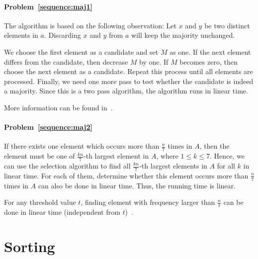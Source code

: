 \begin{Answer}
\paragraph{Problem~\ref{sequence:maj1}}
The algorithm is based on the following observation: Let $x$ and $y$ be two distinct elements in $a$. Discarding $x$ and $y$ from $a$ will keep the majority unchanged. 

We choose the first element as a candidate and set $M$ as one. If the next element differs from the candidate, then decrease $M$ by one. If $M$ becomes zero, then choose the next element as a candidate. Repeat this process until all elements are processed. Finally, we need one more pass to test whether the candidate is indeed a majority. Since this is a two pass algorithm, the algorithm runs in linear time.

\begin{remark}
More information can be found in~\cite{Misra1982}.
\end{remark}

\paragraph{Problem~\ref{sequence:maj2}}
If there exists one element which occurs more than $\frac{n}{7}$ times in $A$, then the element must be one of $\frac{kn}{7}$-th largest element in $A$, where $1 \leq k \leq 7$. Hence, we can use the selection algorithm to find all $\frac{kn}{7}$-th largest elements in $A$ for all $k$ in linear time. For each of them, determine whether this element occurs more than $\frac{n}{7}$ times in $A$ can also be done in linear time. Thus, the running time is linear.

\begin{remark}
For any threshold value $t$, finding element with frequency larger than $\frac{n}{t}$ can be done in linear time (independent from $t$)~\cite{Karp2003}.
\end{remark}
\end{Answer}

\section{Sorting}

